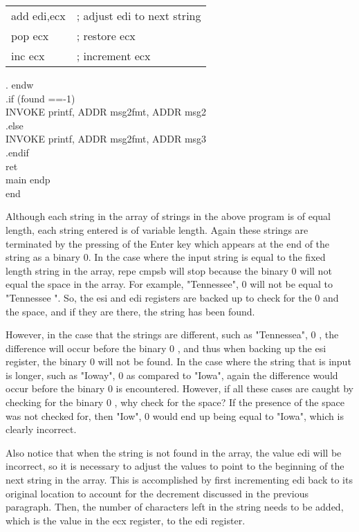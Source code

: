\documentclass[10pt]{article}
\begin{document}
\begin{center}
\begin{tabular}{ll}
add edi,ecx & ; adjust edi to next string \\
pop ecx & ; restore ecx \\
inc ecx & ; increment ecx \\
\end{tabular}
\end{center}

. endw\\
.if (found ==-1)\\
INVOKE printf, ADDR msg2fmt, ADDR msg2\\
.else\\
INVOKE printf, ADDR msg2fmt, ADDR msg3\\
.endif\\
ret\\
main endp\\
end

Although each string in the array of strings in the above program is of equal length, each string entered is of variable length. Again these strings are terminated by the pressing of the Enter key which appears at the end of the string as a binary 0. In the case where the input string is equal to the fixed length string in the array, repe cmpsb will stop because the binary 0 will not equal the space in the array. For example, "Tennessee", 0 will not be equal to "Tennessee ". So, the esi and edi registers are backed up to check for the 0 and the space, and if they are there, the string has been found.

However, in the case that the strings are different, such as "Tennessea", 0 , the difference will occur before the binary 0 , and thus when backing up the esi register, the binary 0 will not be found. In the case where the string that is input is longer, such as "Ioway", 0 as compared to "Iowa", again the difference would occur before the binary 0 is encountered. However, if all these cases are caught by checking for the binary 0 , why check for the space? If the presence of the space was not checked for, then "Iow", 0 would end up being equal to "Iowa", which is clearly incorrect.

Also notice that when the string is not found in the array, the value edi will be incorrect, so it is necessary to adjust the values to point to the beginning of the next string in the array. This is accomplished by first incrementing edi back to its original location to account for the decrement discussed in the previous paragraph. Then, the number of characters left in the string needs to be added, which is the value in the ecx register, to the edi register.
\end{document}
